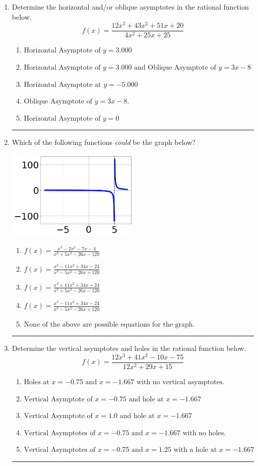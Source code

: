 \documentclass[14pt]{extbook}
\newcommand{\litem}[1]{\item#1\hspace*{-1cm}\rule{\textwidth}{0.4pt}}
\begin{document}
\begin{enumerate}
\litem{
Determine the horizontal and/or oblique asymptotes in the rational function below.\[ f(x) = \frac{12x^{3} +43 x^{2} +51 x + 20}{4x^{2} +25 x + 25} \]\begin{enumerate}[label=\Alph*.]
\item \( \text{Horizontal Asymptote of } y = 3.000  \)
\item \( \text{Horizontal Asymptote of } y = 3.000 \text{ and Oblique Asymptote of } y = 3x -8 \)
\item \( \text{Horizontal Asymptote at } y = -5.000 \)
\item \( \text{Oblique Asymptote of } y = 3x -8. \)
\item \( \text{Horizontal Asymptote of } y = 0 \)

\end{enumerate} }
\litem{
Which of the following functions \textit{could} be the graph below?
\begin{center}
    \includegraphics[width=0.5\textwidth]{../Figures/identifyGraphOfRationalFunctionCopyC.png}
\end{center}
\begin{enumerate}[label=\Alph*.]
\item \( f(x)=\frac{x^{3} -2 x^{2} -7 x -4}{x^{3} +5 x^{2} -26 x -120} \)
\item \( f(x)=\frac{x^{3} -11 x^{2} +34 x -24}{x^{3} -5 x^{2} -26 x + 120} \)
\item \( f(x)=\frac{x^{3} +11 x^{2} +34 x + 24}{x^{3} +5 x^{2} -26 x -120} \)
\item \( f(x)=\frac{x^{3} -11 x^{2} +34 x -24}{x^{3} -5 x^{2} -26 x + 120} \)
\item \( \text{None of the above are possible equations for the graph.} \)

\end{enumerate} }
\litem{
Determine the vertical asymptotes and holes in the rational function below.\[ f(x) = \frac{12x^{3} +41 x^{2} -10 x -75}{12x^{2} +29 x + 15} \]\begin{enumerate}[label=\Alph*.]
\item \( \text{Holes at } x = -0.75 \text{ and } x = -1.667 \text{ with no vertical asymptotes.} \)
\item \( \text{Vertical Asymptote of } x = -0.75 \text{ and hole at } x = -1.667 \)
\item \( \text{Vertical Asymptote of } x = 1.0 \text{ and hole at } x = -1.667 \)
\item \( \text{Vertical Asymptotes of } x = -0.75 \text{ and } x = -1.667 \text{ with no holes.} \)
\item \( \text{Vertical Asymptotes of } x = -0.75 \text{ and } x = 1.25 \text{ with a hole at } x = -1.667 \)


\end{enumerate}}
\end{enumerate}
\end{document}
